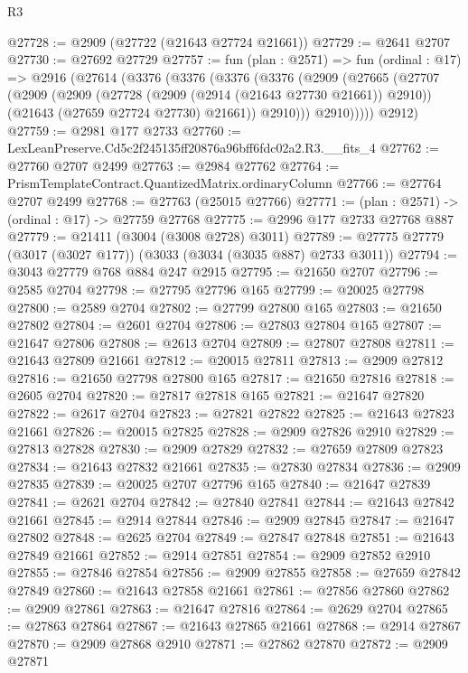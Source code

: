 \begin{lexlean}{R3}
\begin{coremodule}
@27728 := @2909 (@27722 (@21643 @27724 @21661))
@27729 := @2641 @2707
@27730 := @27692 @27729
@27757 := fun (plan : @2571) =>
  fun (ordinal : @17) =>
  @2916
    (@27614
      (@3376
        (@3376
          (@3376
            (@3376
              (@2909
                (@27665
                  (@27707
                    (@2909
                      (@2909
                        (@27728 (@2909 (@2914 (@21643 @27730 @21661)) @2910))
                        (@21643 (@27659 @27724 @27730) @21661))
                      @2910)))
                @2910)))))
      @2912)
@27759 := @2981 @177 @2733
@27760 := LexLeanPreserve.Cd5c2f245135ff20876a96bff6fdc02a2.R3.__fits_4
@27762 := @27760 @2707 @2499
@27763 := @2984 @27762
@27764 := PrismTemplateContract.QuantizedMatrix.ordinaryColumn
@27766 := @27764 @2707 @2499
@27768 := @27763 (@25015 @27766)
@27771 := (plan : @2571) -> (ordinal : @17) -> @27759 @27768
@27775 := @2996 @177 @2733 @27768 @887
@27779 := @21411 (@3004 (@3008 @2728) @3011)
@27789 := @27775 @27779 (@3017 (@3027 @177)) (@3033 (@3034 (@3035 @887) @2733 @3011))
@27794 := @3043 @27779 @768 @884 @247 @2915
@27795 := @21650 @2707
@27796 := @2585 @2704
@27798 := @27795 @27796 @165
@27799 := @20025 @27798
@27800 := @2589 @2704
@27802 := @27799 @27800 @165
@27803 := @21650 @27802
@27804 := @2601 @2704
@27806 := @27803 @27804 @165
@27807 := @21647 @27806
@27808 := @2613 @2704
@27809 := @27807 @27808
@27811 := @21643 @27809 @21661
@27812 := @20015 @27811
@27813 := @2909 @27812
@27816 := @21650 @27798 @27800 @165
@27817 := @21650 @27816
@27818 := @2605 @2704
@27820 := @27817 @27818 @165
@27821 := @21647 @27820
@27822 := @2617 @2704
@27823 := @27821 @27822
@27825 := @21643 @27823 @21661
@27826 := @20015 @27825
@27828 := @2909 @27826 @2910
@27829 := @27813 @27828
@27830 := @2909 @27829
@27832 := @27659 @27809 @27823
@27834 := @21643 @27832 @21661
@27835 := @27830 @27834
@27836 := @2909 @27835
@27839 := @20025 @2707 @27796 @165
@27840 := @21647 @27839
@27841 := @2621 @2704
@27842 := @27840 @27841
@27844 := @21643 @27842 @21661
@27845 := @2914 @27844
@27846 := @2909 @27845
@27847 := @21647 @27802
@27848 := @2625 @2704
@27849 := @27847 @27848
@27851 := @21643 @27849 @21661
@27852 := @2914 @27851
@27854 := @2909 @27852 @2910
@27855 := @27846 @27854
@27856 := @2909 @27855
@27858 := @27659 @27842 @27849
@27860 := @21643 @27858 @21661
@27861 := @27856 @27860
@27862 := @2909 @27861
@27863 := @21647 @27816
@27864 := @2629 @2704
@27865 := @27863 @27864
@27867 := @21643 @27865 @21661
@27868 := @2914 @27867
@27870 := @2909 @27868 @2910
@27871 := @27862 @27870
@27872 := @2909 @27871

\end{coremodule}
\end{lexlean}
